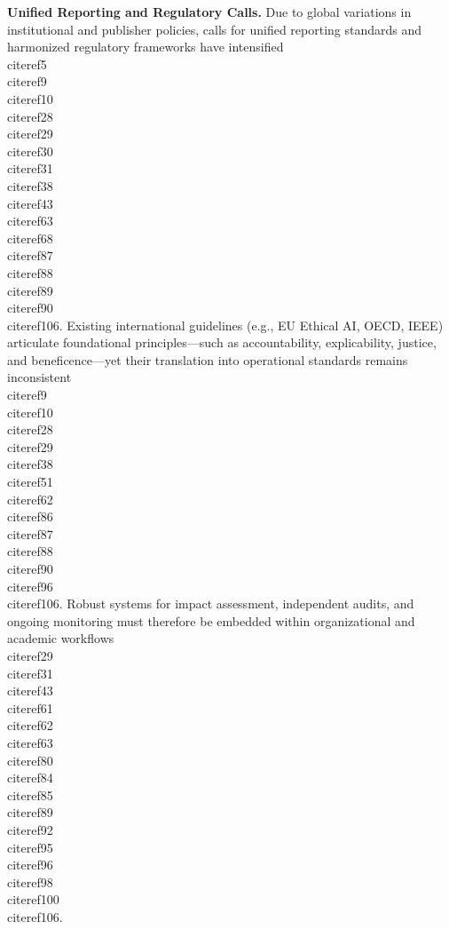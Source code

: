\documentclass[11pt]{article}
\begin{document}
\textbf{Unified Reporting and Regulatory Calls.}  
Due to global variations in institutional and publisher policies, calls for unified reporting standards and harmonized regulatory frameworks have intensified \\cite{ref5}\\cite{ref9}\\cite{ref10}\\cite{ref28}\\cite{ref29}\\cite{ref30}\\cite{ref31}\\cite{ref38}\\cite{ref43}\\cite{ref63}\\cite{ref68}\\cite{ref87}\\cite{ref88}\\cite{ref89}\\cite{ref90}\\cite{ref106}. Existing international guidelines (e.g., EU Ethical AI, OECD, IEEE) articulate foundational principles—such as accountability, explicability, justice, and beneficence—yet their translation into operational standards remains inconsistent \\cite{ref9}\\cite{ref10}\\cite{ref28}\\cite{ref29}\\cite{ref38}\\cite{ref51}\\cite{ref62}\\cite{ref86}\\cite{ref87}\\cite{ref88}\\cite{ref90}\\cite{ref96}\\cite{ref106}. Robust systems for impact assessment, independent audits, and ongoing monitoring must therefore be embedded within organizational and academic workflows \\cite{ref29}\\cite{ref31}\\cite{ref43}\\cite{ref61}\\cite{ref62}\\cite{ref63}\\cite{ref80}\\cite{ref84}\\cite{ref85}\\cite{ref89}\\cite{ref92}\\cite{ref95}\\cite{ref96}\\cite{ref98}\\cite{ref100}\\cite{ref106}.
\end{document}

